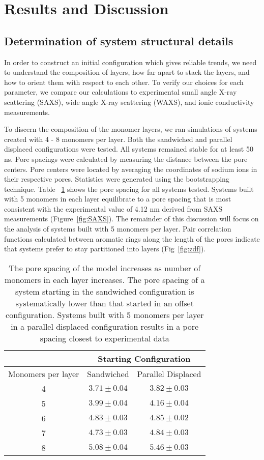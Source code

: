 \section*{Results and Discussion}
\subsection*{Determination of system structural details}
In order to construct an initial configuration which gives reliable 
trends, we need to understand the composition of layers, how far apart
to stack the layers, and how to orient them with respect to each other.
To verify our choices for each parameter, we compare our calculations
to experimental small angle X-ray scattering (SAXS), wide angle X-ray
scattering (WAXS), and ionic conductivity measurements.

To discern the composition of the monomer layers, we ran simulations of 
systems created with 4 - 8 monomers per layer. Both the sandwiched and 
parallel displaced configurations were tested. All systems remained
stable for at least 50 ns. Pore spacings were calculated by measuring
the distance between the pore centers. Pore centers were located by
averaging the coordinates of sodium ions in their respective pores. 
Statistics were generated using the bootstrapping technique. Table
~\ref{table:p2p} shows the pore spacing for all systems tested.
Systems built with 5 monomers in each layer equilibrate to a pore
spacing that is most consistent with the experimental value of 4.12 nm
derived from SAXS measurements (Figure~\ref{fig:SAXS}). The remainder of
this discussion will focus on the analysis of systems built with 5 
monomers per layer. Pair correlation functions calculated between 
aromatic rings along the length of the pores indicate that systems
prefer to stay partitioned into layers (Fig~\ref{fig:zdf}).

\begin{table}[H]
\centering
\begin{tabular}{ccc}
\toprule
                   & \multicolumn{2}{c}{Starting Configuration} \\
\hline
Monomers per layer & Sandwiched & Parallel Displaced \\
\midrule
4 & $3.71 \pm 0.04$ & $3.82 \pm 0.03$ \\
5 & $3.99 \pm 0.04$ & $4.16 \pm 0.04$ \\
6 & $4.83 \pm 0.03$ & $4.85 \pm 0.02$ \\
7 & $4.73 \pm 0.03$ & $4.84 \pm 0.03$ \\
8 & $5.08 \pm 0.04$ & $5.46 \pm 0.03$ \\
\bottomrule
\end{tabular}
\caption{The pore spacing of the model increases as number of monomers
in each layer increases. The pore spacing of a system starting in the 
sandwiched configuration is systematically lower than that started in an 
offset configuration. Systems built with 5 monomers per layer in a parallel
displaced configuration results in a pore spacing closest to experimental
data}\label{table:p2p} 
\end{table}

